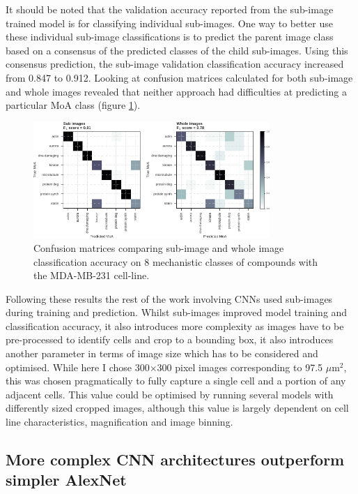 \documentclass[a4paper,11pt,twoside,openright]{scrbook}
\begin{document}
It should be noted that the validation accuracy reported from the sub-image trained model is for classifying individual 
sub-images.
One way to better use these individual sub-image classifications is to predict the parent image class based on a 
consensus of the predicted classes of the child sub-images.
Using this consensus prediction, the sub-image validation classification accuracy increased from 0.847 to 0.912.
Looking at confusion matrices calculated for both sub-image and whole images revealed that neither approach had 
difficulties at predicting a particular MoA class (figure \ref{figure:nn_chopped_vs_whole_cm}).

\begin{figure}
    \includegraphics[width=0.8\textwidth]{ch2choppedWholeCM}
    \captionsetup{width=0.8\textwidth}
    \caption[Sub image and whole image confusion matrices]{
Confusion matrices comparing sub-image and whole image classification accuracy on 8 mechanistic classes of compounds 
with the MDA-MB-231 cell-line.
}
    \label{figure:nn_chopped_vs_whole_cm}
\end{figure}

Following these results the rest of the work involving CNNs used sub-images during training and prediction.
Whilst sub-images improved model training and classification accuracy, it also introduces more complexity as images 
have to be pre-processed to identify cells and crop to a bounding box, it also introduces another parameter in terms of 
image size which has to be considered and optimised.
While here I chose 300$\times$300 pixel images corresponding to 97.5 $\mu$m$^2$, this was chosen pragmatically to fully 
capture a single cell and a portion of any adjacent cells.
This value could be optimised by running several models with differently sized cropped images, although this value is 
largely dependent on cell line characteristics, magnification and image binning.


\subsection{More complex CNN architectures outperform simpler AlexNet}
\end{document}
